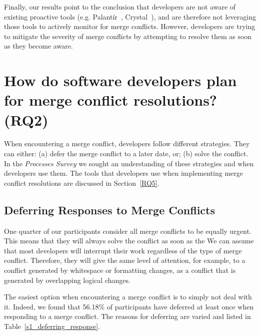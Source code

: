 Finally, our results point to the conclusion that developers are not aware of existing proactive tools (e.g. Palant\'{i}r~\cite{sarma_palantir:_2003}, Crystal~\cite{Brun2011}), and are therefore not leveraging those tools to actively monitor for merge conflicts.
However, developers are trying to mitigate the severity of merge conflicts by attempting to resolve them as soon as they become aware.

\section{How do software developers \textbf{plan} for merge conflict resolutions? (RQ2)}\label{RQ2}

When encountering a merge conflict, developers follow different strategies.
They can either: (a) defer the merge conflict to a later date, or; (b) solve the conflict.
In the \textit{Processes Survey} we sought an understanding of these strategies and when developers use them.
The tools that developers use when implementing merge conflict resolutions are discussed in Section~\ref{RQ5}.

\subsection{Deferring Responses to Merge Conflicts}

One quarter of our participants consider all merge conflicts to be equally urgent.
This means that they will always solve the conflict as soon as the 
We can assume that most developers will interrupt their work regardless of the type of merge conflict.
Therefore, they will give the same level of attention, for example, to a conflict generated by whitespace or formatting changes, as a conflict that is generated by overlapping logical changes. 

The easiest option when encountering a merge conflict is to simply not deal with it.
Indeed, we found that 56.18\% of participants have deferred at least once when responding to a merge conflict.
The reasons for deferring are varied and listed in Table~\ref{s1_deferring_response}.

